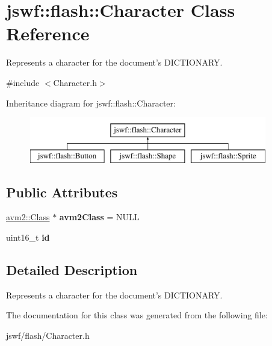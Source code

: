 \hypertarget{classjswf_1_1flash_1_1_character}{\section{jswf\+:\+:flash\+:\+:Character Class Reference}
\label{classjswf_1_1flash_1_1_character}
}


Represents a character for the document's {\ttfamily D\+I\+C\+T\+I\+O\+N\+A\+R\+Y}.  




{\ttfamily \#include $<$Character.\+h$>$}

Inheritance diagram for jswf\+:\+:flash\+:\+:Character\+:\begin{figure}[H]
\begin{center}
\leavevmode
\includegraphics[height=2.000000cm]{classjswf_1_1flash_1_1_character}
\end{center}
\end{figure}
\subsection*{Public Attributes}
\begin{DoxyCompactItemize}
\item 
\hypertarget{classjswf_1_1flash_1_1_character_afa7b888be7a630ddd7a3efce690972f9}{\hyperlink{classjswf_1_1avm2_1_1_class}{avm2\+::\+Class} $\ast$ {\bfseries avm2\+Class} = N\+U\+L\+L}\label{classjswf_1_1flash_1_1_character_afa7b888be7a630ddd7a3efce690972f9}

\item 
\hypertarget{classjswf_1_1flash_1_1_character_a6583f97041d1b876721aed1e6e2b51a4}{uint16\+\_\+t {\bfseries id}}\label{classjswf_1_1flash_1_1_character_a6583f97041d1b876721aed1e6e2b51a4}

\end{DoxyCompactItemize}


\subsection{Detailed Description}
Represents a character for the document's {\ttfamily D\+I\+C\+T\+I\+O\+N\+A\+R\+Y}. 

The documentation for this class was generated from the following file\+:\begin{DoxyCompactItemize}
\item 
jswf/flash/Character.\+h\end{DoxyCompactItemize}
